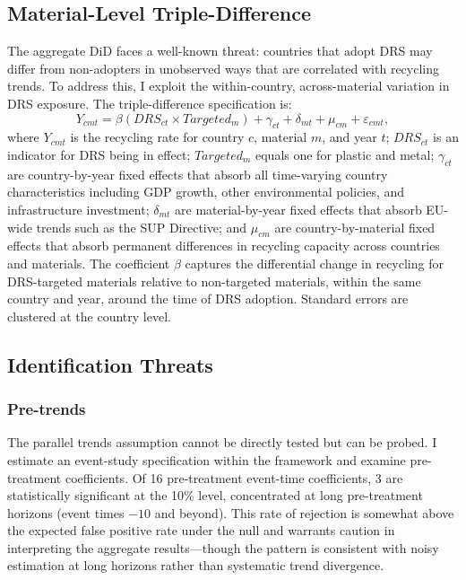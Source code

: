 \documentclass[12pt]{article}
\begin{document}
\subsection{Material-Level Triple-Difference}

The aggregate DiD faces a well-known threat: countries that adopt DRS may differ from non-adopters in unobserved ways that are correlated with recycling trends. To address this, I exploit the within-country, across-material variation in DRS exposure. The triple-difference specification is:
\begin{equation}
Y_{cmt} = \beta \left(DRS_{ct} \times Targeted_m\right) + \gamma_{ct} + \delta_{mt} + \mu_{cm} + \varepsilon_{cmt},
\label{eq:ddd}
\end{equation}
where $Y_{cmt}$ is the recycling rate for country $c$, material $m$, and year $t$; $DRS_{ct}$ is an indicator for DRS being in effect; $Targeted_m$ equals one for plastic and metal; $\gamma_{ct}$ are country-by-year fixed effects that absorb all time-varying country characteristics including GDP growth, other environmental policies, and infrastructure investment; $\delta_{mt}$ are material-by-year fixed effects that absorb EU-wide trends such as the SUP Directive; and $\mu_{cm}$ are country-by-material fixed effects that absorb permanent differences in recycling capacity across countries and materials. The coefficient $\beta$ captures the differential change in recycling for DRS-targeted materials relative to non-targeted materials, within the same country and year, around the time of DRS adoption. Standard errors are clustered at the country level.

\subsection{Identification Threats}

\subsubsection*{Pre-trends} The parallel trends assumption cannot be directly tested but can be probed. I estimate an event-study specification within the \citet{callaway2021difference} framework and examine pre-treatment coefficients. Of 16 pre-treatment event-time coefficients, 3 are statistically significant at the 10\% level, concentrated at long pre-treatment horizons (event times $-10$ and beyond). This rate of rejection is somewhat above the expected false positive rate under the null and warrants caution in interpreting the aggregate results---though the pattern is consistent with noisy estimation at long horizons rather than systematic trend divergence.
\end{document}
